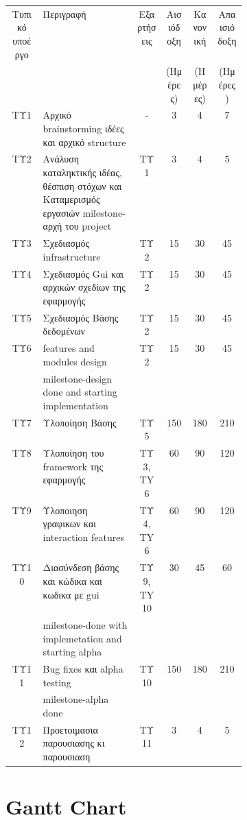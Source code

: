 \documentclass[11pt]{scrartcl} %
\begin{document}
\begin{table}[h]
    \hspace{-1.5cm}
    \begin{tabular}{|c|p{0.4\linewidth}|c|c|c|c|}
    \hline
        Τυπικό υποέργο & Περιγραφή & Εξαρτήσεις & Αισιόδοξη & Κανονική & Απαισιόδοξη \\
        ~ & ~ & ~ & (Ημέρες) & (Ημέρες) & (Ημέρες) \\ \hline
        ΤΥ1 & Aρχικό brainstorming ιδέες και αρχικό structure & - & 3 & 4 & 7 \\ \hline
        TΥ2 & Aνάλυση καταληκτικής ιδέας, θέσπιση στόχων και Kαταμερισμός εργασιών milestone-αρχή του project & ΤΥ1 & 3 & 4 & 5 \\ \hline
        TΥ3 & Σχεδιασμός infrastructure & ΤΥ2 & 15 & 30 & 45 \\ \hline
        TΥ4 & Σχεδιασμός Gui και αρχικών σχεδίων της εφαρμογής & ΤΥ2 & 15 & 30 & 45 \\ \hline
        TΥ5 & Σχεδιασμός Βάσης δεδομένων & ΤΥ2 & 15 & 30 & 45 \\ \hline
        TΥ6 & features and modules design & TΥ2 & 15 & 30 & 45 \\ \hline
        ~ & milestone-design done and starting implementation & ~ & ~ & ~ & ~ \\ \hline
        TΥ7 & Υλοποίηση Βάσης & TΥ5 & 150 & 180 & 210 \\ \hline
        TΥ8 & Υλοποίηση του framework της εφαρμογής & TΥ3, TY6 & 60 & 90 & 120 \\ \hline
        TΥ9 & Υλοποιηση γραφικων και interaction features & ΤΥ4, TY6 & 60 & 90 & 120 \\ \hline
        TΥ10 & Διασύνδεση βάσης και κώδικα και κωδικα με gui & ΤΥ9, TY10 & 30 & 45 & 60 \\
        ~ & milestone-done with implemetation and starting alpha & ~ & ~ & ~ & ~ \\ \hline
        TΥ11 & Bug fixes και alpha testing  & ΤΥ10 & 150 & 180 & 210 \\
        ~ & milestone-alpha done & ~ & ~ & ~ & ~ \\ \hline
        TΥ12 & Προετοιμασια παρουσιασης κι παρουσιαση & ΤΥ11 & 3 & 4 & 5 \\ \hline
    \end{tabular}
\end{table}
\pagebreak

\section{Gantt Chart}
\end{document}
